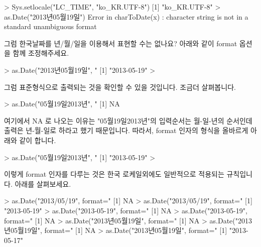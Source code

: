 \begin{Schunk}
\begin{Soutput} 
> Sys.setlocale("LC_TIME", "ko_KR.UTF-8")
[1] "ko_KR.UTF-8"
> as.Date("2013년05월19일")
Error in charToDate(x) : 
  character string is not in a standard unambiguous format
\end{Soutput}
\end{Schunk}

그럼 한국날짜를 년/월/일을 이용해서 표현할 수는 없나요? 
아래와 같이 format 옵션을 함께 조정해주세요.

\begin{Schunk}
\begin{Soutput} 
> as.Date("2013년05월19일", "%Y년%m월%d일")
[1] "2013-05-19"
> 
\end{Soutput}
\end{Schunk}

그럼 표준형식으로 출력되는 것을 확인할 수 있을 것입니다.
조금더 살펴봅니다.

\begin{Schunk}
\begin{Soutput} 
> as.Date("05월19일2013년", "%Y년%m월%d일")
[1] NA
\end{Soutput}
\end{Schunk}

여기에서 NA 로 나오는 이유는 "05월19일2013년"의 입력순서는 월-일-년의 순서인데 출력은 년-월-일로 하라고 했기 때문입니다. 
따라서, format 인자의 형식을 올바르게 아래와 같이 합니다.

\begin{Schunk}
\begin{Soutput} 
> as.Date("05월19일2013년", "%m월%d일%Y년")
[1] "2013-05-19"
> 
\end{Soutput}
\end{Schunk}

이렇게 format 인자를 다루는 것은 한국 로케일외에도 일반적으로 적용되는 규칙입니다.
아래를 살펴보세요.

\begin{Schunk}
\begin{Soutput} 
> as.Date("2013/05/19", format="%Y-%m-%d")
[1] NA
> as.Date("2013/05/19", format="%Y/%m/%d")
[1] "2013-05-19"
> as.Date("2013-05-19", format="%Y/%m/%d")
[1] NA
> as.Date("2013-05-19", format="%Y%m%d")
[1] NA
> as.Date("2013년05월19일", format="%Y/m/%d")
[1] NA
> as.Date("2013년05월19일", format="%Y/%m/%d")
[1] NA
> as.Date("2013년05월19일", format="%Y년%m월%d")
[1] "2013-05-17"
\end{Soutput}
\end{Schunk}

